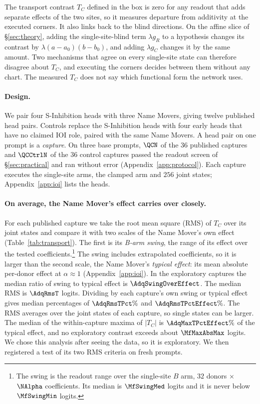 \documentclass{article}
\theoremstyle{plain}
\theoremstyle{definition}
\begin{document}
The transport contrast $T_C$ defined in the box is zero for any readout that adds separate effects of the two sites, so it measures departure from
additivity at the executed corners. It also links back to the blind directions. On the affine slice of
\S\ref{sec:theory}, adding the single-site-blind term $\lambda g_R$ to a hypothesis changes its contrast by
$\lambda(a-a_0)(b-b_0)$, and adding $\lambda g_C$ changes it by the same amount. Two mechanisms that agree on every
single-site state can therefore disagree about $T_C$, and executing the corners decides between them without any
chart. The measured $T_C$ does not say which functional form the network uses.

\paragraph{Design.} We pair four S-Inhibition heads with three Name Movers, giving twelve published head pairs.
Controls replace the S-Inhibition heads with four early heads that have no claimed IOI role, paired with the same Name
Movers. A head pair on one prompt is a \emph{capture}. On three base prompts, $\QCN$ of the $36$ published captures and
$\QCCtrlN$ of the $36$ control captures passed the readout screen of \S\ref{sec:practical} and ran without error (Appendix~\ref{app:protocol}). Each capture executes the single-site arms, the clamped arm
and $256$ joint states; Appendix~\ref{app:ioi} lists the heads.

\paragraph{On average, the Name Mover's effect carries over closely.} For each published capture we take the root mean
square (RMS) of $T_C$ over its joint states and compare it with two scales of the Name Mover's own effect
(Table~\ref{tab:transport}). The first is its \emph{B-arm swing}, the range of its effect over the tested
coefficients.\footnote{The swing is the readout range over the single-site $B$ arm, $32$ donors $\times$ $\NAlpha$
coefficients. Its median is $\MfSwingMed$ logits and it is never below $\MfSwingMin$ logits.} The swing includes
extrapolated coefficients, so it is larger than the second scale, the Name Mover's \emph{typical effect}: its mean
absolute per-donor effect at $\alpha\approx1$ (Appendix~\ref{app:ioi}). In the exploratory captures the median ratio
of swing to typical effect is $\AdqSwingOverEffect$. The median RMS is $\AdqRmsT$ logits. Dividing by each
capture's own swing or typical effect gives median percentages of $\AdqRmsTPct\%$ and $\AdqRmsTPctEffect\%$. The RMS averages over the joint states of each capture, so
single states can be larger. The median of the within-capture maxima of $|T_C|$ is $\AdqMaxTPctEffect\%$ of the typical
effect, and no exploratory contrast exceeds about $\MfMaxAbsMax$ logits. We chose this analysis after seeing the data,
so it is exploratory. We then registered a test of its two RMS criteria on fresh prompts.
\end{document}
